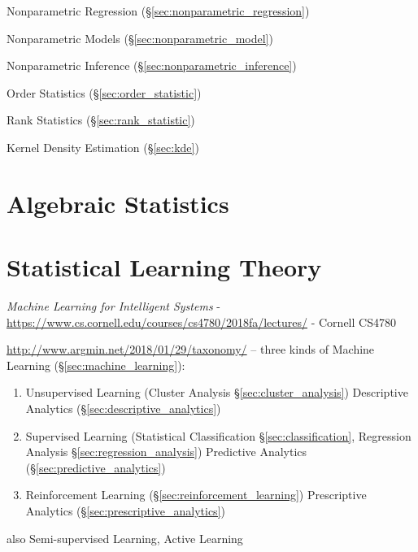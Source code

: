 Nonparametric Regression (\S\ref{sec:nonparametric_regression})

Nonparametric Models (\S\ref{sec:nonparametric_model})

Nonparametric Inference (\S\ref{sec:nonparametric_inference})

Order Statistics (\S\ref{sec:order_statistic})

Rank Statistics (\S\ref{sec:rank_statistic})

Kernel Density Estimation (\S\ref{sec:kde})



\section{Algebraic Statistics}\label{sec:algebraic_statistics}

\section{Statistical Learning Theory}\label{sec:statistical_learning_theory}


\emph{Machine Learning for Intelligent Systems} -
\url{https://www.cs.cornell.edu/courses/cs4780/2018fa/lectures/} -
Cornell CS4780

\url{http://www.argmin.net/2018/01/29/taxonomy/} -- three kinds of Machine
Learning (\S\ref{sec:machine_learning}):
\begin{enumerate}
  \item Unsupervised Learning (Cluster Analysis \S\ref{sec:cluster_analysis})
    \fist Descriptive Analytics (\S\ref{sec:descriptive_analytics})
  \item Supervised Learning (Statistical Classification
    \S\ref{sec:classification}, Regression Analysis
    \S\ref{sec:regression_analysis}) \fist Predictive Analytics
    (\S\ref{sec:predictive_analytics})
  \item Reinforcement Learning (\S\ref{sec:reinforcement_learning})
    \fist Prescriptive Analytics (\S\ref{sec:prescriptive_analytics})
\end{enumerate}
also Semi-supervised Learning, Active Learning




